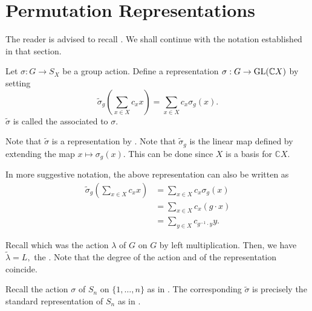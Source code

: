 \section{Permutation Representations}

The reader is advised to recall . We shall continue with the notation established in that section.

\begin{defn}%
	\label{defn:permrep}
	Let $\sigma : G \to S_X$ be a group action. Define a representation $\sigma : G \to \operatorname{GL}(\mathbb{C}X)$ by setting
	\begin{equation*} 
		\widetilde{\sigma}_g\left(\sum_{x \in X} c_x x\right) = \sum_{x \in X} c_x \sigma_g(x).
	\end{equation*}
	$\widetilde{\sigma}$ is called the  associated to $\sigma.$
\end{defn}

\begin{rem}
	Note that $\widetilde{\sigma}$ is a representation by . Note that $\widetilde{\sigma}_g$ is the linear map defined by extending the map $x \mapsto \sigma_g(x).$ This can be done since $X$ is a basis for $\mathbb{C}X.$

	In more suggestive notation, the above representation can also be written as
	\begin{align*} 
		\widetilde{\sigma}_g\left(\sum_{x \in X} c_x x\right) &= \sum_{x \in X} c_x \sigma_g(x)\\
		&= \sum_{x \in X} c_x(g \cdot x)\\
		&= \sum_{y \in X} c_{g^{-1} \cdot y} y.
	\end{align*}
\end{rem}

\begin{rem}
	Recall  which was the action $\lambda$ of $G$ on $G$ by left multiplication. Then, we have $\widetilde{\lambda} = L,$ the .	Note that the degree of the action and of the representation coincide.
\end{rem}

\begin{rem} \label{rem:stdrepSnispermrepofstdact}
	Recall the action $\sigma$ of $S_n$ on $\{1, \ldots, n\}$ as in . The corresponding $\widetilde{\sigma}$ is precisely the standard representation of $S_n$ as in .
\end{rem}

